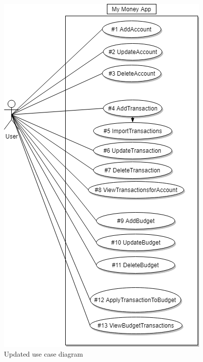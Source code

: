 \documentclass[12pt]{article}
\begin{document}
\begin{figure}[H]
\centering
\caption{Updated use case diagram}
\includegraphics[scale=0.5]{Diagrams/UML/SOEN.png}
\end{figure}


\end{document}
